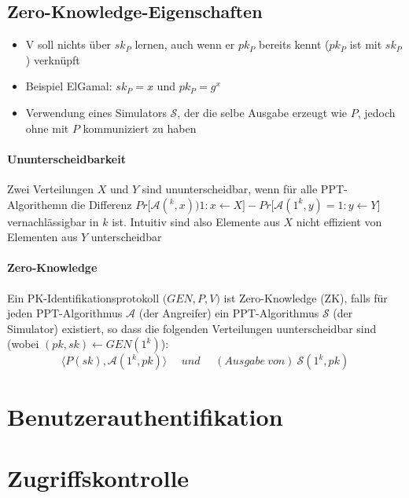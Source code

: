 \subsection{Zero-Knowledge-Eigenschaften}
\begin{itemize}
	\item V soll nichts über \(sk_P\) lernen, auch wenn er \(pk_P\) bereits kennt (\(pk_P\) ist mit \(sk_P\)) verknüpft
	\item Beispiel ElGamal: \(sk_P = x\) und \(pk_P = g^x\)
	\item Verwendung eines Simulators \(\mathcal{S}\), der die selbe Ausgabe erzeugt wie \(P\), jedoch ohne mit \(P\) kommuniziert zu haben
\end{itemize}

\paragraph{Ununterscheidbarkeit} Zwei Verteilungen \(X\) und \(Y\) sind ununterscheidbar, wenn für alle PPT-Algorithemn die Differenz \(Pr\big\lbrack\mathcal{A}(^k,x) ) 1 : x\leftarrow X\big\rbrack - Pr\big\lbrack\mathcal{A}(1^k,y) = 1 : y\leftarrow Y\big\rbrack\) vernachlässigbar in \(k\) ist. Intuitiv sind also Elemente aus \(X\) nicht effizient von Elementen aus \(Y\) unterscheidbar

\paragraph{Zero-Knowledge} Ein PK-Identifikationsprotokoll \(\big(GEN,P,V\big)\) ist Zero-Knowledge (ZK), falls für jeden PPT-Algorithmus \(\mathcal{A}\) (der Angreifer) ein PPT-Algorithmus \(\mathcal{S}\) (der Simulator) existiert, so dass die folgenden Verteilungen uunterscheidbar sind (wobei \((pk,sk) \leftarrow GEN(1^k)\)):
\[\langle P(sk),\mathcal{A}(1^k,pk)\rangle~~~~~~und~~~~~~(Ausgabe~von)~\mathcal{S}(1^k,pk)\]



\section{Benutzerauthentifikation}



\section{Zugriffskontrolle}

